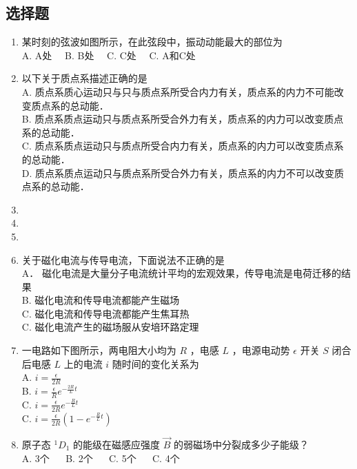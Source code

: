 
\subsection{选择题}

\begin{enumerate}

\item 某时刻的弦波如图所示，在此弦段中，振动动能最大的部位为\\

A. A处$\quad$
B. B处$\quad$
C. C处$\quad$
C. A和C处$\quad$

\item 以下关于质点系描述正确的是\\

A. 质点系质心运动只与只与质点系所受合内力有关，质点系的内力不可能改变质点系的总动能．\\
B. 质点系质点运动只与质点系所受合外力有关，质点系的内力可以改变质点系的总动能．\\
C. 质点系质点运动只与质点所受合内力有关，质点系的内力可以改变质点系的总动能．\\
D. 质点系质点运动只与质点系所受合外力有关，质点系的内力不可以改变质点系的总动能．\\

\item 

\item 

\item 

\item 关于磁化电流与传导电流，下面说法不正确的是\\

A． 磁化电流是大量分子电流统计平均的宏观效果，传导电流是电荷迁移的结果\\
B. 磁化电流和传导电流都能产生磁场\\
C. 磁化电流和传导电流都能产生焦耳热\\
C. 磁化电流产生的磁场服从安培环路定理\\

\item 一电路如下图所示，两电阻大小均为 $R$ ，电感 $L$ ，电源电动势 $\epsilon$ 开关 $S$ 闭合后电感 $L$ 上的电流 $i$ 随时间的变化关系为\\

A. $i = \frac{\epsilon}{2R}$\\
B. $i = \frac{\epsilon}{R}e^{-\frac{2R}{L}t}$\\
C. $i = \frac{\epsilon}{2R}e^{-\frac{R}{L}t}$\\
C. $i = \frac{\epsilon}{2R}(1-e^{-\frac{R}{L}t})$\\

\item 原子态 $^{1}D_{1}$ 的能级在磁感应强度 $\vec{B}$ 的弱磁场中分裂成多少子能级？\\

A. 3个 $\quad$
B. 2个 $\quad$
C. 5个 $\quad$
C. 4个 $\quad$
\end{enumerate}

